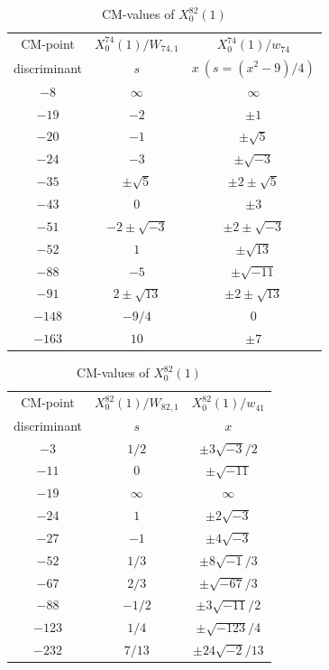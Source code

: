 \documentclass{amsart}
\theoremstyle{definition}
\begin{document}
\begin{appendices}
\begin{table}
\end{table}



\renewcommand{\arraystretch}{1.5}
\tabcolsep=10pt                         
\begin{table}
\begin{tabular}{|c|c|c|}
\hline
CM-point& ${X_{0}^{74}(1)/W_{74,1}}$ & ${X_{0}^{74}(1)/w_{74}}$ \\ 
       discriminant   & $s$ & $x\ (s=(x^2-9)/{4})$  \\ \hline
${-8}$ & $\infty$ & $\infty$  \\ 
${-19}$ & $-2$ & $\pm 1$  \\
${-20}$ & $-1$ & $\pm \sqrt{5}$   \\
${-24}$ & $-3$ & $\pm \sqrt{-3}$  \\ 
${-35}$ & $\pm\sqrt{5}$ & $\pm 2\pm \sqrt{5}$\\
${-43}$ & $0$ & $\pm 3$  \\
${-51}$ & $-2\pm \sqrt{-3}$ & $\pm 2\pm \sqrt{-3}$   \\ 
${-52}$ & $1$ & $\pm \sqrt{13}$  \\
${-88}$ & $-5$ & $\pm \sqrt{-11}$ \\ 
${-91}$ & $2\pm \sqrt{13}$ & $\pm 2\pm \sqrt{13}$  \\
${-148}$ & $-{9}/{4}$ & $0$ \\ 
${-163}$ & $10$ & $\pm 7$   \\ \hline
\end{tabular}
\bigskip
\caption{CM-values of $X^{74}_0(1)$}




\renewcommand{\arraystretch}{1.5}
\tabcolsep=10pt                         
\begin{tabular}{|c|c|c|}
\hline
CM-point& ${X_{0}^{82}(1)/W_{82,1}}$ & ${X_{0}^{82}(1)/w_{41}}$  \\ 
        discriminant  & $s$ & $x$  \\ \hline
${-3}$ & ${1}/{2}$ & $ \pm{3\sqrt{-3}}/{2}$ \\ 
${-11}$ & $0$ & $ \pm\sqrt{-11}$ \\ 
${-19}$ & $\infty $ & $\infty $ \\ 
${-24}$ & $1$ & $\pm2\sqrt{-3}$  \\ 
${-27}$ & $-1$ &$\pm4\sqrt{-3}$ \\
${-52}$ & ${1}/{3}$ & $ \pm8\sqrt{-1}/3$
\\ 
${-67}$ & ${2}/{3}$ & $\pm\sqrt{-67}/3$ \\ 
${-88}$ & $-{1}/{2}$ & $ \pm3\sqrt{-11}/2$
\\ 
${-123}$ & ${1}/{4}$ & $ \pm\sqrt{-123}/4$  \\
${-232}$ & ${7}/{13}$ & $ \pm24\sqrt{-2}/13$ \\ \hline
\end{tabular}
\bigskip
\caption{CM-values of $X^{82}_0(1)$}
\end{table}


\end{appendices}
\end{document}
